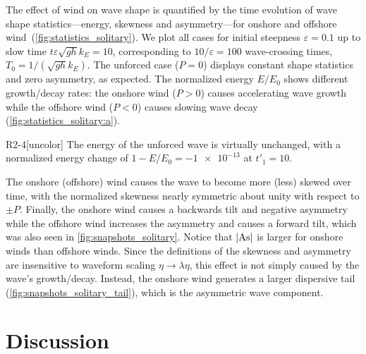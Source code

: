 \documentclass{jfm}
\DeclareMathOperator{\As}{As}
\renewcommand*{\epsilon}{\varepsilon}
\begin{document}
The effect of wind on wave shape is quantified by the time evolution of
wave shape statistics---energy, skewness and asymmetry---for onshore
and offshore wind~(\cref{fig:statistics_solitary}).
We plot all cases for initial steepness $\epsilon = 0.1$ up to slow time
$t \epsilon \sqrt{g h} k_E = 10$, corresponding to $10/\epsilon = 100$
wave-crossing times, $T_0 = 1/(\sqrt{gh} k_E)$.
The unforced case ($P=0$) displays constant shape statistics and zero
asymmetry, as expected.
The normalized energy $E/E_0$ shows different growth/decay rates:
the onshore wind ($P>0$) causes accelerating wave growth while the
offshore wind ($P<0$) causes slowing wave decay
(\cref{fig:statistics_solitary:a}).
\begin{LineLabel}{R2-4}[uncolor]
The energy of the unforced wave is virtually unchanged, with a
normalized energy change of $1-E/E_0 = \num{-1e-13}$ at $t'_1 = 10$.
\end{LineLabel}
The onshore (offshore) wind causes the wave to become more (less) skewed
over time, with the normalized skewness nearly symmetric about unity
with respect to $\pm P$.
Finally, the onshore wind causes a backwards tilt and negative asymmetry
while the offshore wind increases the asymmetry and causes a forward
tilt, which was also seen in \cref{fig:snapshots_solitary}.
Notice that $\abs{\As}$ is larger for onshore winds than offshore winds.
Since the definitions of the skewness and asymmetry are insensitive to
waveform scaling $\eta \to \lambda \eta$, this effect is not simply
caused by the wave's growth/decay.
Instead, the onshore wind generates a larger dispersive tail
(\cref{fig:snapshots_solitary_tail}), which is the asymmetric wave
component.

\section{\label{sec:discussion} Discussion}
\end{document}
